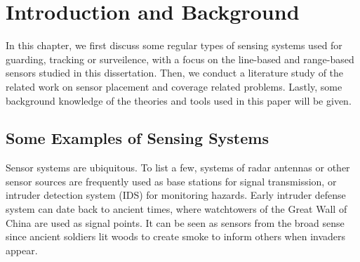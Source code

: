 
\chapter{Introduction and Background} 
\thispagestyle{myheadings} 
In this chapter, we first discuss some regular types of sensing systems 
used for guarding, tracking or surveilence, 
with a focus on the line-based and range-based sensors studied in this dissertation. 
Then, we conduct a literature study of the related work on sensor placement and 
coverage related problems. 
Lastly, some background knowledge of the theories and tools used in this paper will be given. 
\section{Some Examples of Sensing Systems} 
Sensor systems are ubiquitous. To list a few, systems of radar antennas 
or other sensor sources are frequently used as base stations for signal transmission, 
or intruder detection system (IDS) for monitoring hazards. 
Early intruder defense system can date back to ancient times, where 
watchtowers of the Great Wall of China are used as signal points. 
It can be seen as sensors from the broad sense 
since ancient soldiers lit woods to create smoke to inform others when invaders appear. 
